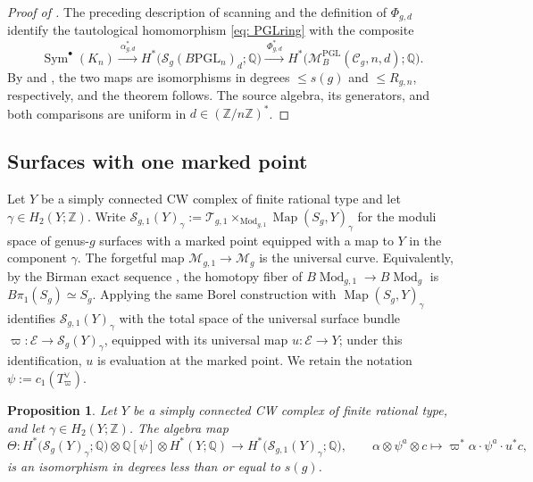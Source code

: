 \documentclass[11pt,reqno]{amsart}
\theoremstyle{plain} %
\newtheorem{prop}[theorem]{Proposition}
\theoremstyle{definition}
\newcommand{\QQ}{\mathbb{Q}}
\newcommand{\M}{\mathcal{M}}
\newcommand{\C}{\mathcal{C}}
\newcommand{\mc}{\mathcal}
\newcommand{\ZZ}{\mathbb{Z}}
\DeclareMathOperator{\PGL}{PGL}
\newcommand{\BPGL}{B\mathrm{PGL}}
\DeclareMathOperator{\Mod}{Mod}
\DeclareMathOperator{\Sym}{Sym}
\DeclareMathOperator{\Map}{Map}
\newcommand{\Sc}{\mathcal{S}}
\begin{document}
\begin{proof}[Proof of ]
The preceding description of scanning and the definition of $\Phi_{g,d}$ identify the tautological homomorphism \eqref{eq: PGLring} with the composite
\[
\Sym^\bullet(K_n)
\xrightarrow{\ \alpha_{g,d}^*\ }
H^*\big(\Sc_g(\BPGL_n)_d;\QQ\big)
\xrightarrow{\ \Phi_{g,d}^*\ }
H^*\big(\M_B^{\PGL}(\C_g,n,d);\QQ\big).
\]
By  and , the two maps are isomorphisms in degrees $\le s(g)$ and $\le R_{g,n}$, respectively, and the theorem follows. The source algebra, its generators, and both comparisons are uniform in $d\in(\ZZ/n\ZZ)^*$.
\end{proof}






\subsection{Surfaces with one marked point} \label{subsec: marked point}

Let $Y$ be a simply connected CW complex of finite rational type and let $\gamma \in H_2(Y;\ZZ)$. Write $\Sc_{g,1}(Y)_\gamma := \mc T_{g,1} \times_{\Mod_{g,1}} \Map(S_g,Y)_\gamma$ for the moduli space of genus-$g$ surfaces with a marked point equipped with a map to $Y$ in the component $\gamma$. The forgetful map $\M_{g,1}\to\M_g$ is the universal curve. Equivalently, by the Birman exact sequence \cite[\S 4.2]{Farb-Margalit}, the homotopy fiber of $B\Mod_{g,1}\to B\Mod_g$ is $B\pi_1(S_g)\simeq S_g$. Applying the same Borel construction with $\Map(S_g,Y)_\gamma$ identifies $\Sc_{g,1}(Y)_\gamma$ with the total space of the universal surface bundle $\varpi \colon \mathcal E \to \Sc_g(Y)_\gamma$, equipped with its universal map $u \colon \mathcal E \to Y$; under this identification, $u$ is evaluation at the marked point. We retain the notation $\psi := c_1(T_\varpi^\vee)$.

\begin{prop} \label{prop: marked point}
Let $Y$ be a simply connected CW complex of finite rational type, and let $\gamma \in H_2(Y;\ZZ)$. The algebra map
\[
\Theta \colon H^*\big(\Sc_g(Y)_\gamma;\QQ\big) \otimes \QQ[\psi] \otimes H^*(Y;\QQ) \longrightarrow H^*\big(\Sc_{g,1}(Y)_\gamma;\QQ\big), \qquad \alpha \otimes \psi^a \otimes c \longmapsto \varpi^*\alpha \cdot \psi^a \cdot u^*c,
\]
is an isomorphism in degrees less than or equal to $s(g)$.
\end{prop}
\end{document}
